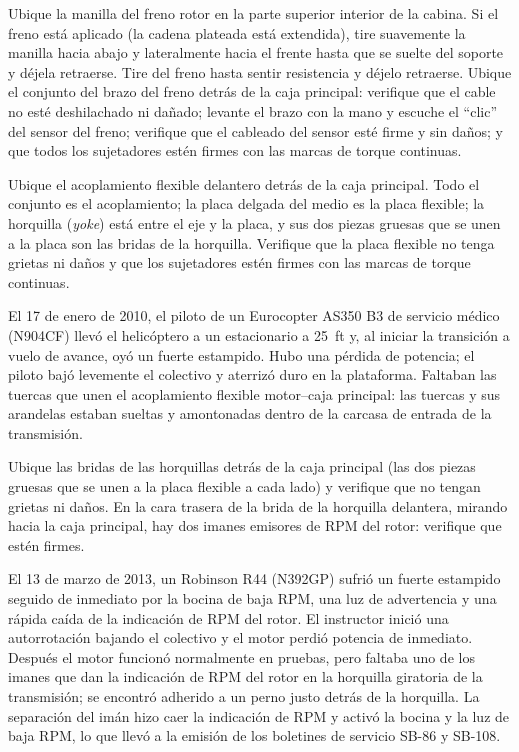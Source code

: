 Ubique la manilla del freno rotor en la parte superior interior de la cabina. Si el freno está aplicado (la cadena plateada está extendida), tire suavemente la manilla hacia abajo y lateralmente hacia el frente hasta que se suelte del soporte y déjela retraerse. Tire del freno hasta sentir resistencia y déjelo retraerse. Ubique el conjunto del brazo del freno detrás de la caja principal: verifique que el cable no esté deshilachado ni dañado; levante el brazo con la mano y escuche el ``clic'' del sensor del freno; verifique que el cableado del sensor esté firme y sin daños; y que todos los sujetadores estén firmes con las marcas de torque continuas.

Ubique el acoplamiento flexible delantero detrás de la caja principal. Todo el conjunto es el acoplamiento; la placa delgada del medio es la placa flexible; la horquilla (\emph{yoke}) está entre el eje y la placa, y sus dos piezas gruesas que se unen a la placa son las bridas de la horquilla. Verifique que la placa flexible no tenga grietas ni daños y que los sujetadores estén firmes con las marcas de torque continuas.

\begin{caso}
El 17 de enero de 2010, el piloto de un Eurocopter AS350 B3 de servicio médico (N904CF) llevó el helicóptero a un estacionario a 25~ft y, al iniciar la transición a vuelo de avance, oyó un fuerte estampido. Hubo una pérdida de potencia; el piloto bajó levemente el colectivo y aterrizó duro en la plataforma. Faltaban las tuercas que unen el acoplamiento flexible motor--caja principal: las tuercas y sus arandelas estaban sueltas y amontonadas dentro de la carcasa de entrada de la transmisión.
\end{caso}

Ubique las bridas de las horquillas detrás de la caja principal (las dos piezas gruesas que se unen a la placa flexible a cada lado) y verifique que no tengan grietas ni daños. En la cara trasera de la brida de la horquilla delantera, mirando hacia la caja principal, hay dos imanes emisores de RPM del rotor: verifique que estén firmes.

\begin{caso}
El 13 de marzo de 2013, un Robinson R44 (N392GP) sufrió un fuerte estampido seguido de inmediato por la bocina de baja RPM, una luz de advertencia y una rápida caída de la indicación de RPM del rotor. El instructor inició una autorrotación bajando el colectivo y el motor perdió potencia de inmediato. Después el motor funcionó normalmente en pruebas, pero faltaba uno de los imanes que dan la indicación de RPM del rotor en la horquilla giratoria de la transmisión; se encontró adherido a un perno justo detrás de la horquilla. La separación del imán hizo caer la indicación de RPM y activó la bocina y la luz de baja RPM, lo que llevó a la emisión de los boletines de servicio SB-86 y SB-108.
\end{caso}

